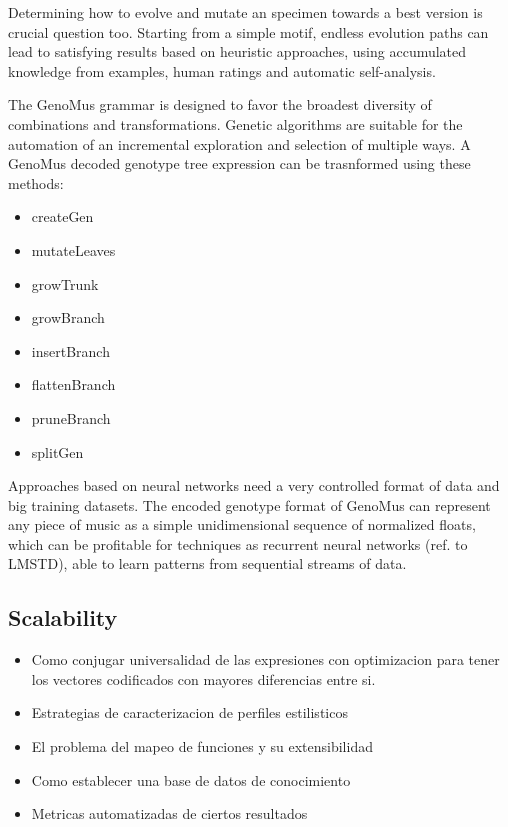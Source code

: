 \documentclass{article}
\begin{document}
Determining how to evolve and mutate an specimen towards a best version is crucial question too. Starting from a simple motif, endless evolution paths can lead to satisfying results based on heuristic approaches, using accumulated knowledge from examples, human ratings and automatic self-analysis.

The GenoMus grammar is designed to favor the broadest diversity of combinations and transformations. Genetic algorithms are suitable for the automation of an incremental exploration and selection of multiple ways. A GenoMus decoded genotype tree expression can be trasnformed using these methods:

\begin{itemize}
\item createGen
\item mutateLeaves
\item growTrunk
\item growBranch
\item insertBranch
\item flattenBranch
\item pruneBranch
\item splitGen

\end{itemize}

Approaches based on neural networks need a very controlled format of data and big training datasets. The encoded genotype format of GenoMus can represent any piece of music as a simple unidimensional sequence of normalized floats, which can be profitable for techniques as recurrent neural networks (ref. to LMSTD), able to learn patterns from sequential streams of data.


\subsection{Scalability}

{\color{gray}


\begin{itemize}
\item Como conjugar universalidad de las expresiones con optimizacion para tener los vectores codificados con mayores diferencias entre si.
\item Estrategias de caracterizacion de perfiles estilisticos
\item El problema del mapeo de funciones y su extensibilidad
\item Como establecer una base de datos de conocimiento
\item Metricas automatizadas de ciertos resultados
\end{itemize}

}
\end{document}
